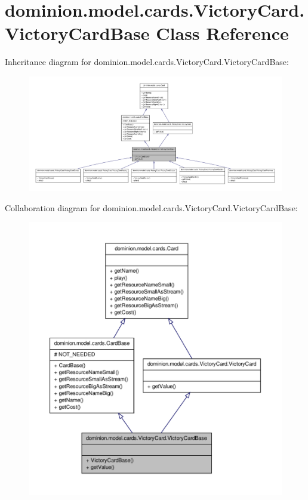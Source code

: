 \hypertarget{classdominion_1_1model_1_1cards_1_1VictoryCard_1_1VictoryCardBase}{\section{dominion.\-model.\-cards.\-Victory\-Card.\-Victory\-Card\-Base \-Class \-Reference}
\label{classdominion_1_1model_1_1cards_1_1VictoryCard_1_1VictoryCardBase}
}


\-Inheritance diagram for dominion.\-model.\-cards.\-Victory\-Card.\-Victory\-Card\-Base\-:
\nopagebreak
\begin{figure}[H]
\begin{center}
\leavevmode
\includegraphics[width=350pt]{classdominion_1_1model_1_1cards_1_1VictoryCard_1_1VictoryCardBase__inherit__graph}
\end{center}
\end{figure}


\-Collaboration diagram for dominion.\-model.\-cards.\-Victory\-Card.\-Victory\-Card\-Base\-:
\nopagebreak
\begin{figure}[H]
\begin{center}
\leavevmode
\includegraphics[width=350pt]{classdominion_1_1model_1_1cards_1_1VictoryCard_1_1VictoryCardBase__coll__graph}
\end{center}
\end{figure}
